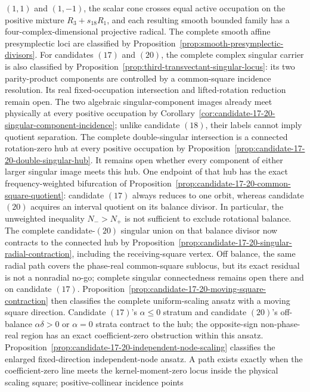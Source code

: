 \documentclass[11pt]{article}
\theoremstyle{definition}
\theoremstyle{remark}
\begin{document}
\((1,1)\) and \((1,-1)\), the scalar cone crosses equal active occupation on
the positive mixture \(R_3+s_{18}R_1\), and each resulting smooth bounded
family has a four-complex-dimensional projective radical.  The complete
smooth affine presymplectic loci are classified by
Proposition~\ref{prop:smooth-presymplectic-divisors}.  For candidates
\((17)\) and \((20)\), the complete complex singular carrier is also
classified by Proposition~\ref{prop:third-transvectant-singular-locus}: its
two parity-product components are controlled by a common-square incidence
resolution.  Its real fixed-occupation intersection and lifted-rotation
reduction remain open.  The two algebraic singular-component images already
meet physically at every positive occupation by
Corollary~\ref{cor:candidate-17-20-singular-component-incidence}; unlike
candidate \((18)\), their labels cannot imply quotient separation.  The
complete double-singular intersection is a connected rotation-zero hub at
every positive occupation by
Proposition~\ref{prop:candidate-17-20-double-singular-hub}.  It remains open
whether every component of either larger singular image meets this hub.
One endpoint of that hub has the exact frequency-weighted bifurcation of
Proposition~\ref{prop:candidate-17-20-common-square-quotient}: candidate
\((17)\) always reduces to one orbit, whereas candidate \((20)\) acquires an
interval quotient on its balance divisor.  In particular, the unweighted
inequality \(N_->N_+\) is not sufficient to exclude rotational balance.  The
complete candidate-\((20)\) singular union on that balance divisor now
contracts to the connected hub by
Proposition~\ref{prop:candidate-17-20-singular-radial-contraction}, including
the receiving-square vertex.  Off balance, the same radial path covers the
phase-real common-square sublocus, but its exact residual is not a nonradial
no-go; complete singular connectedness remains open there and on candidate
\((17)\).  Proposition~\ref{prop:candidate-17-20-moving-square-contraction}
then classifies the complete uniform-scaling ansatz with a moving square
direction.  Candidate \((17)\)'s \(\alpha\leq0\) stratum and candidate
\((20)\)'s off-balance \(\alpha\delta>0\) or \(\alpha=0\) strata contract
to the hub; the opposite-sign non-phase-real region has an exact
coefficient-zero obstruction within this ansatz.
Proposition~\ref{prop:candidate-17-20-independent-node-scaling} classifies
the enlarged fixed-direction independent-node ansatz.  A path exists
exactly when the coefficient-zero line meets the kernel-moment-zero locus
inside the physical scaling square; positive-collinear incidence points
\end{document}
